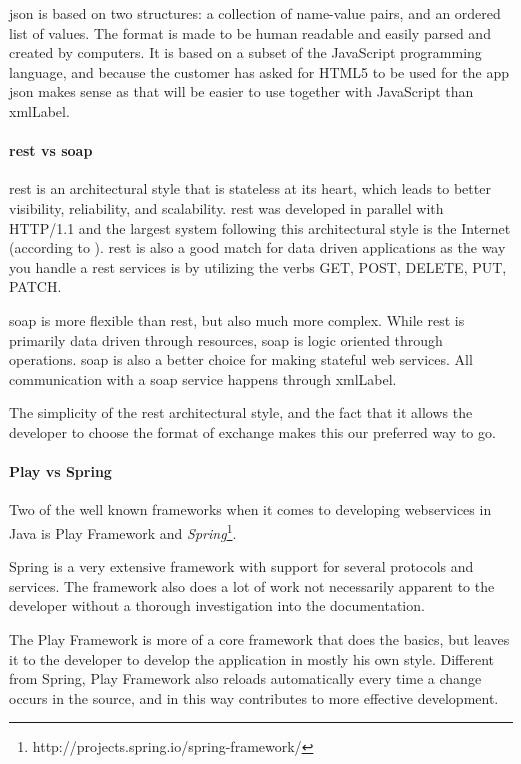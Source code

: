 \documentclass[11pt]{book}
\begin{document}
\gls{json} \cite{json} is based on two structures: a collection of name-value pairs, and an ordered list of values. The format is made to be human readable and easily parsed and created by computers. It is based on a subset of the JavaScript programming language, and because the customer has asked for HTML5 to be used for the app \gls{json} makes sense as that will be easier to use together with JavaScript than \gls{xmlLabel}.

\paragraph{\gls{rest} vs \gls{soap}}
\gls{rest} \cite{rest} is an architectural style that is stateless at its heart, which leads to better visibility, reliability, and scalability. \gls{rest} was developed in parallel with HTTP/1.1 and the largest system following this architectural style is the Internet (according to \cite{wikipedia:rest}). \gls{rest} is also a good match for data driven applications as the way you handle a \gls{rest} services is by utilizing the verbs GET, POST, DELETE, PUT, PATCH.

\gls{soap} is more flexible than \gls{rest}, but also much more complex. While \gls{rest} is primarily data driven through resources, \gls{soap} is logic oriented through operations. \gls{soap} is also a better choice for making stateful web services. All communication with a \gls{soap} service happens through \gls{xmlLabel}.

The simplicity of the \gls{rest} architectural style, and the fact that it allows the developer to choose the format of exchange makes this our preferred way to go.

\paragraph{Play vs Spring}
Two of the well known frameworks when it comes to developing webservices in Java is Play Framework and \emph{Spring}\footnote{http://projects.spring.io/spring-framework/}.

Spring is a very extensive framework with support for several protocols and services. The framework also does a lot of work not necessarily apparent to the developer without a thorough investigation into the documentation.

The Play Framework is more of a core framework that does the basics, but leaves it to the developer to develop the application in mostly his own style. Different from Spring, Play Framework also reloads automatically every time a change occurs in the source, and in this way contributes to more effective development.
\end{document}
